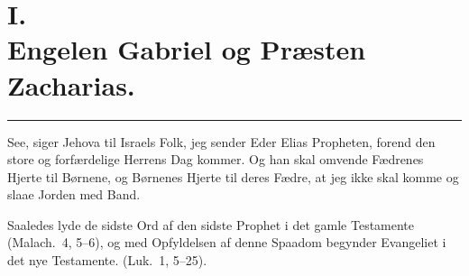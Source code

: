 \documentclass[12pt,a4paper]{book}
\begin{document}
\section*{I.\\[4pt] Engelen Gabriel og Præsten Zacharias.}

\begin{center}
  \rule{0.14\textwidth}{0.4pt}
\end{center}

\begingroup\large
See, siger Jehova til Israels Folk, jeg sender Eder Elias
Propheten, forend den store og forfærdelige Herrens Dag
kommer. Og han skal omvende Fædrenes Hjerte til Børnene, og
Børnenes Hjerte til deres Fædre, at jeg ikke skal komme og slaae
Jorden med Band.
\par\endgroup

Saaledes lyde de sidste Ord af den sidste Prophet i det gamle
Testamente (Malach.\ 4, 5--6), og med Opfyldelsen af denne Spaadom
begynder Evangeliet i det nye Testamente. (Luk.\ 1, 5--25).
\end{document}

